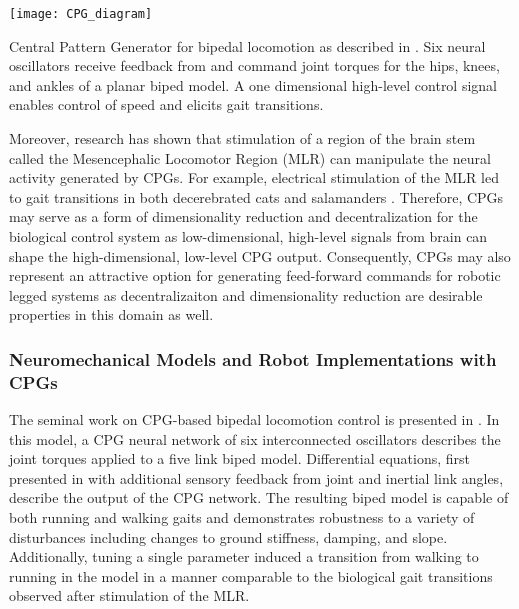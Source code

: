 \begin{marginfigure}
    \centering
    \texttt{[image: CPG\_diagram]}
    \caption{Central Pattern Generator for bipedal locomotion as described in
    \citet{taga1991self}. Six neural oscillators receive feedback from and
    command joint torques for the hips, knees, and ankles of a planar biped
    model. A one dimensional high-level control signal enables control of speed
    and elicits gait transitions.}
    \label{fig:cpg_diagram}
\end{marginfigure}
Moreover, research has shown that stimulation of a region of the brain stem
called the Mesencephalic Locomotor Region (MLR) can manipulate the neural
activity generated by CPGs. For example, electrical stimulation of the MLR led
to gait transitions in both decerebrated cats \citep{shik1966control} and
salamanders \citep{cabelguen2003bimodal}.  Therefore, CPGs may serve as a form
of dimensionality reduction and decentralization for the biological control
system as low-dimensional, high-level signals from brain can shape the
high-dimensional, low-level CPG output. Consequently, CPGs may also represent an
attractive option for generating feed-forward commands for robotic legged
systems as decentralizaiton and dimensionality reduction are desirable
properties in this domain as well.

\subsubsection{Neuromechanical Models and Robot Implementations with CPGs}
The seminal work on CPG-based bipedal locomotion control is presented in
\citet{taga1991self}. In this model, a CPG neural network of six interconnected
oscillators describes the joint torques applied to a five link biped model.
Differential equations, first presented in \citet{matsuoka1987mechanisms} with
additional sensory feedback from joint and inertial link angles, describe the
output of the CPG network. The resulting biped model is capable of both running
and walking gaits  and demonstrates robustness to a variety of disturbances
including changes to ground stiffness, damping, and slope. Additionally, tuning
a single parameter induced a transition from walking to running in the model in
a manner comparable to the biological gait transitions observed after
stimulation of the MLR.

